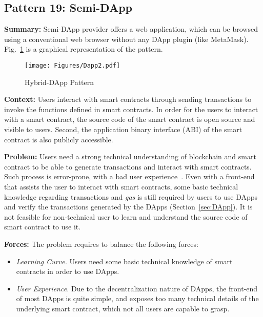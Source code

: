 
\subsection{\textbf{Pattern 19: Semi-DApp}}
\label{sec:SemiDApp}

\noindent \textbf{Summary:} Semi-DApp provider offers a web application, which can be browsed using a conventional web browser without any DApp plugin (like MetaMask). Fig.~\ref{fig:Dapp2} is a graphical representation of the pattern.

\begin{figure}[t]
\begin{center}
\texttt{[image: Figures/Dapp2.pdf]}
\caption{Hybrid-DApp Pattern}\label{fig:Dapp2}
\end{center}
\end{figure}

\vspace{0.5em}\noindent \textbf{Context:} 
Users interact with smart contracts through sending transactions to invoke the functions defined in smart contracts. In order for the users to interact with a smart contract, the source code of the smart contract is open source and visible to users. Second, the application binary interface (ABI) of the smart contract is also publicly accessible. 

\vspace{0.5em}\noindent \textbf{Problem:} 
Users need a strong technical understanding of blockchain and smart contract to be able to generate transactions and interact with smart contracts. Such process is error-prone, with a bad user experience~\cite{patternICSA2018}. Even with a front-end that assists the user to interact with smart contracts, some basic technical knowledge regarding transactions and \textit{gas} is still required by users to use DApps and verify the transactions generated by the DApps (Section~\ref{sec:DApp}). It is not feasible for non-technical user to learn and understand the source code of smart contract to use it.

\vspace{0.5em}\noindent \textbf{Forces:} 
The problem requires to balance the following forces:
\begin{itemize}
  \item \textit{Learning Curve.} Users need some basic technical knowledge of smart contracts in order to use DApps. 
  \item \textit{User Experience.} Due to the decentralization nature of DApps, the front-end of most DApps is quite simple, and exposes too many technical details of the underlying smart contract, which not all users are capable to grasp.
\end{itemize}

